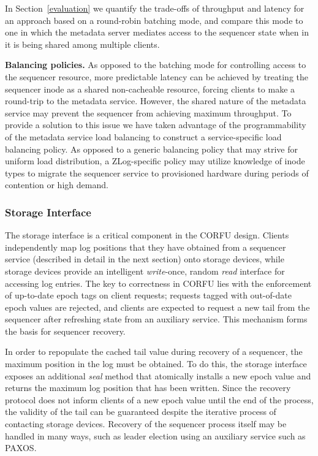 \documentclass[preprint]{sigplanconf-eurosys}
\begin{document}
In Section~\ref{evaluation} we quantify the trade-offs of throughput and
latency for an approach based on a round-robin batching mode, and compare this
mode to one in which the metadata server mediates access to the sequencer
state when in it is being shared among multiple clients.

{\bf Balancing policies.}
As opposed to the batching mode for controlling access to the sequencer
resource, more predictable latency can be achieved by treating the sequencer
inode as a shared non-cacheable resource, forcing clients to make a round-trip
to the metadata service. However, the shared nature of the metadata service
may prevent the sequencer from achieving maximum throughput. To provide a
solution to this issue we have taken advantage of the programmability of the
metadata service load balancing to construct a service-specific load balancing
policy. As opposed to a generic balancing policy that may strive for uniform
load distribution, a ZLog-specific policy may utilize knowledge of inode types
to migrate the sequencer service to provisioned hardware during periods of
contention or high demand.

\subsubsection{Storage Interface}

The storage interface is a critical component in the CORFU design. Clients
independently map log positions that they have obtained from a sequencer
service (described in detail in the next section) onto storage devices, while
storage devices provide an intelligent \emph{write}-once, random \emph{read}
interface for accessing log entries. The key to correctness in CORFU lies with
the enforcement of up-to-date epoch tags on client requests; requests tagged
with out-of-date epoch values are rejected, and clients are expected to
request a new tail from the sequencer after refreshing state from an auxiliary
service.  This mechanism forms the basis for sequencer recovery.

In order to repopulate the cached tail value during recovery of a sequencer,
the maximum position in the log must be obtained. To do this, the storage
interface exposes an additional \emph{seal} method that atomically installs a
new epoch value and returns the maximum log position that has been written.
Since the recovery protocol does not inform clients of a new epoch value until
the end of the process, the validity of the tail can be guaranteed despite the
iterative process of contacting storage devices.  Recovery of the sequencer
process itself may be handled in many ways, such as leader election using an
auxiliary service such as PAXOS.
\end{document}
